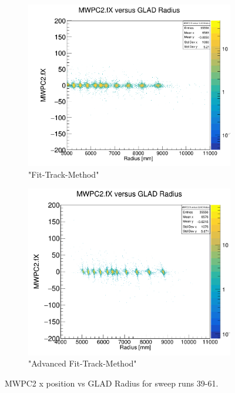 \documentclass[12pt, letterpaper]{article}
\begin{document}
\begin{figure}[!htbp]
\begin{subfigure}{.5\textwidth}
\end{subfigure}
\begin{subfigure}{.5\textwidth}
  \centering
  \includegraphics[width=.9\linewidth]{plot_imgs/mw2_rho_fit.png} 
  \caption{"Fit-Track-Method"}
  \label{fig:sub-second}
\end{subfigure}
\begin{subfigure}{.5\textwidth}
  \centering
  \includegraphics[width=.9\linewidth]{plot_imgs/mw2_rho_alpha.png} 
  \caption{"Advanced Fit-Track-Method"}
  \label{fig:sub-second}
\end{subfigure}
\caption{MWPC2 x position vs GLAD Radius for sweep runs 39-61.}
\label{fig:fig}
\end{figure}
\FloatBarrier
\clearpage
\end{document}
